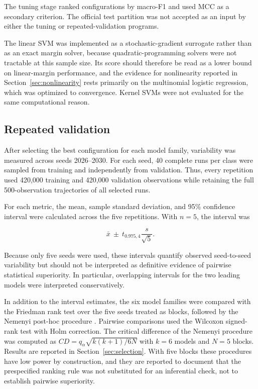 \documentclass[10pt,twocolumn,a4paper]{article}
\begin{document}
The tuning stage ranked configurations by macro-F1 and used MCC as a secondary
criterion. The official test partition was not accepted as an input by either
the tuning or repeated-validation programs.

The linear SVM was implemented as a stochastic-gradient surrogate rather than
as an exact margin solver, because quadratic-programming solvers were not
tractable at this sample size. Its score should therefore be read as a lower
bound on linear-margin performance, and the evidence for nonlinearity reported
in Section~\ref{sec:nonlinearity} rests primarily on the multinomial logistic
regression, which was optimized to convergence. Kernel SVMs were not evaluated
for the same computational reason.

\subsection{Repeated validation}
\label{sec:repeated}

After selecting the best configuration for each model family, variability was
measured across seeds 2026--2030. For each seed, 40 complete runs per class were
sampled from training and independently from validation. Thus, every repetition
used 420,000 training and 420,000 validation observations while retaining the
full 500-observation trajectories of all selected runs.

For each metric, the mean, sample standard deviation, and 95\% confidence
interval were calculated across the five repetitions. With $n=5$, the interval
was

\begin{equation}
\bar{x}\ \pm\ t_{0.975,4}\frac{s}{\sqrt{5}}.
\end{equation}

Because only five seeds were used, these intervals quantify observed
seed-to-seed variability but should not be interpreted as definitive evidence
of pairwise statistical superiority. In particular, overlapping intervals for
the two leading models were interpreted conservatively.

In addition to the interval estimates, the six model families were compared
with the Friedman rank test over the five seeds treated as blocks, followed by
the Nemenyi post-hoc procedure \cite{demsar2006statistical}. Pairwise
comparisons used the Wilcoxon signed-rank test with Holm correction. The
critical difference of the Nemenyi procedure was computed as
$\mathit{CD}=q_{\alpha}\sqrt{k(k+1)/6N}$ with $k=6$ models and $N=5$ blocks.
Results are reported in Section~\ref{sec:selection}. With five blocks these
procedures have low power by construction, and they are reported to document
that the prespecified ranking rule was not substituted for an inferential
check, not to establish pairwise superiority.
\end{document}
